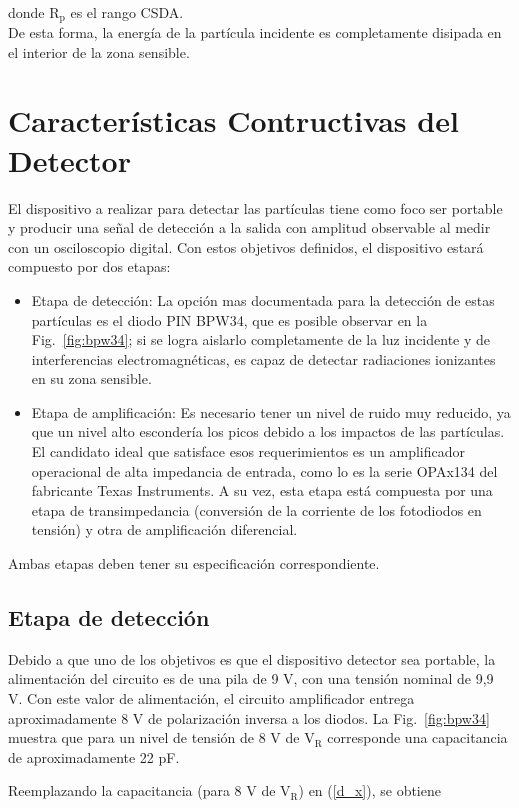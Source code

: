 \documentclass[a4paper,conference]{IEEEtran}
\begin{document}
        \hfill \\ donde $\mathrm{R_{p}}$ es el rango CSDA.\\
        De esta forma, la energía de la partícula incidente es completamente
        disipada en el interior de la zona sensible.

    \section{Características Contructivas del Detector}
        El dispositivo a realizar para detectar las partículas tiene como foco
        ser portable y producir una señal de detección a la salida con amplitud
        observable al medir con un osciloscopio digital. Con estos objetivos
        definidos, el dispositivo estará compuesto por dos etapas:
        \begin{itemize}
            \item Etapa de detección: La opción mas documentada para la
                detección de estas partículas es el diodo PIN BPW34, que es
                posible observar en la Fig.~\ref{fig:bpw34}; si se logra
                aislarlo completamente de la luz incidente y de interferencias
                electromagnéticas, es capaz de detectar radiaciones ionizantes
                en su zona sensible.
            \item Etapa de amplificación: Es necesario tener un nivel de ruido
                muy reducido, ya que un nivel alto escondería los picos debido a
                los impactos de las partículas. El candidato ideal que satisface
                esos requerimientos es un amplificador operacional de alta
                impedancia de entrada, como lo es la serie OPAx134 del
                fabricante Texas Instruments. A su vez, esta etapa está
                compuesta por una etapa de transimpedancia (conversión de la
                corriente de los fotodiodos en tensión) y otra de amplificación
                diferencial.
        \end{itemize}

        Ambas etapas deben tener su especificación correspondiente.

        \subsection{Etapa de detección}
            Debido a que uno de los objetivos es que el dispositivo detector sea
            portable, la alimentación del circuito es de una pila de 9 V, con
            una tensión nominal de 9,9 V. Con este valor de alimentación, el
            circuito amplificador entrega aproximadamente 8 V de polarización
            inversa a los diodos. La Fig.~\ref{fig:bpw34}
            muestra que para un nivel de tensión de 8 V de $\mathrm{V_{R}}$
            corresponde una capacitancia de aproximadamente 22 pF.\par
            Reemplazando la capacitancia (para 8 V de $\mathrm{V_{R}}$) en
            (\ref{d_x}), se obtiene
\end{document}
